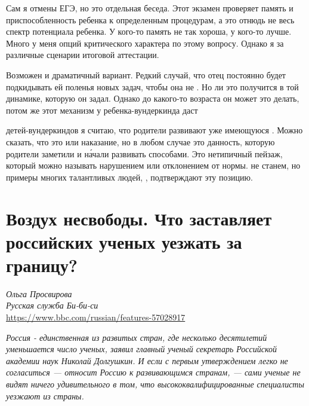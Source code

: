 Сам я  отмены ЕГЭ, но это отдельная беседа. Этот экзамен проверяет память и приспособленность ребенка к определенным процедурам, а это отнюдь не весь спектр потенциала ребенка. У кого-то память не так хороша, у кого-то лучше. Много у меня опций критического характера по этому вопросу. Однако я за различные сценарии итоговой аттестации.

\begin{fancyquotes}
    Возможен и драматичный вариант. Редкий случай, что отец постоянно будет подкидывать ей поленья новых задач, чтобы она не . Но  ли это получится в той динамике, которую он задал. Однако до какого-то возраста он может это делать, потом же этот механизм у ребенка-вундеркинда даст 
\end{fancyquotes}

 детей-вундеркиндов я считаю, что родители развивают уже имеющуюся . Можно сказать, что это  или наказание, но в любом случае это данность, которую родители заметили и н\'{а}чали развивать  способами. Это нетипичный пейзаж, который можно называть  нарушением или отклонением от нормы.  не станем, но примеры многих талантливых людей, , подтверждают эту позицию.




\section[Воздух несвободы]{Воздух несвободы. Что заставляет российских ученых уезжать за границу?}
\textit{Ольга Просвирова}\\
\textit{Русская служба Би-би-си}\\
\url{https://www.bbc.com/russian/features-57028917}

\textit{Россия - единственная из развитых стран, где несколько десятилетий  уменьшается число ученых, заявил главный ученый секретарь Российской академии наук Николай Долгушкин. И если с первым утверждением легко не согласиться ---  относит Россию к развивающимся странам, --- сами ученые не видят ничего удивительного в том, что высококвалифицированные специалисты уезжают из страны.}

